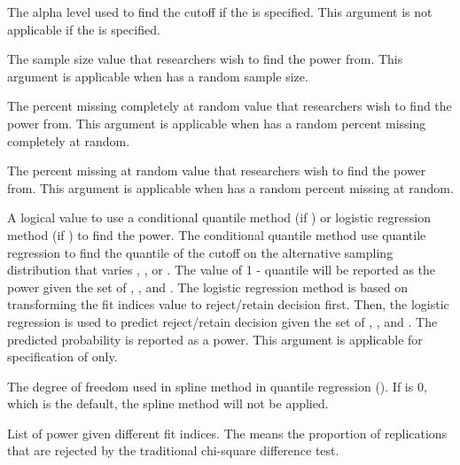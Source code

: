 \documentclass[a4paper]{book}
\begin{document}
\begin{Arguments}
\begin{ldescription}
\item[\code{alpha}] 
The alpha level used to find the cutoff if the  is specified. This argument is not applicable if the  is specified.

\item[\code{nVal}] 
The sample size value that researchers wish to find the power from. This argument is applicable when  has a random sample size. 

\item[\code{pmMCARval}] 
The percent missing completely at random value that researchers wish to find the power from. This argument is applicable when  has a random percent missing completely at random. 

\item[\code{pmMARval}] 
The percent missing at random value that researchers wish to find the power from. This argument is applicable when  has a random percent missing at random. 

\item[\code{condCutoff}] 
A logical value to use a conditional quantile method (if ) or logistic regression method (if ) to find the power. The conditional quantile method use quantile regression to find the quantile of the cutoff on the alternative sampling distribution that varies , , or . The value of 1 - quantile will be reported as the power given the set of , , and . The logistic regression method is based on transforming the fit indices value to reject/retain decision first. Then, the logistic regression is used to predict reject/retain decision given the set of , , and . The predicted probability is reported as a power. This argument is applicable for specification of  only.

\item[\code{df}] 
The degree of freedom used in spline method in quantile regression (). If  is 0, which is the default, the spline method will not be applied.

\end{ldescription}
\end{Arguments}
%
\begin{Value}
List of power given different fit indices. The  means the proportion of replications that are rejected by the traditional chi-square difference test.
\end{Value}
\end{document}

